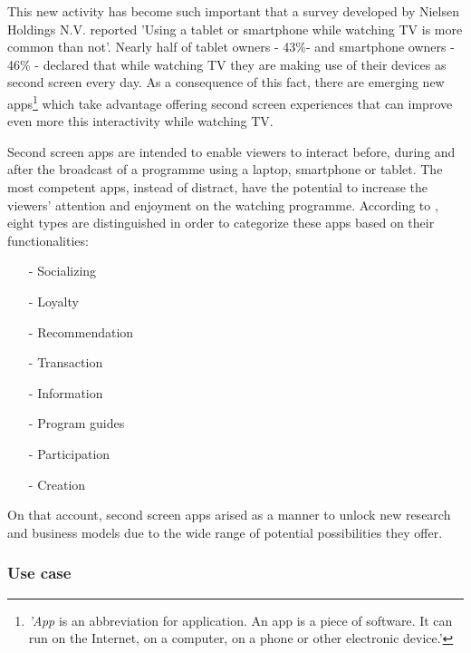 \documentclass{acm_proc_article-sp}
\begin{document}
This new activity has become such important that a survey developed by Nielsen Holdings N.V. \cite{nielsentv} reported 'Using a tablet or smartphone while watching TV is more common than not'. Nearly half of tablet owners - 43\%- and smartphone owners - 46\% - declared that while watching TV they are making use of their devices as second screen every day. As a consequence of this fact, there are emerging new apps\cite{wiki:app}\footnote{\textit{'App} is an abbreviation for application. An app is a piece of software. It can run on the Internet, on a computer, on a phone or other electronic device.'} which take advantage offering second screen experiences that can improve even more this interactivity while watching TV. 

Second screen apps \cite{evolumedia1} are intended to enable viewers to interact before, during and after the broadcast of a programme using a laptop, smartphone or tablet. The most competent apps, instead of distract, have the potential to increase the viewers' attention and enjoyment on the watching programme. According to \cite{evolumedia1}, eight types are distinguished in order to categorize these apps based on their functionalities: 
\begin{itemize}
  \item[-] Socializing
  \item[-] Loyalty
  \item[-] Recommendation
  \item[-] Transaction
  \item[-] Information
  \item[-] Program guides
  \item[-] Participation
  \item[-] Creation
\end{itemize}
On that account, second screen apps arised as a manner to unlock new research and business models due to the wide range of potential possibilities they offer. 

\subsubsection{Use case}
\end{document}

